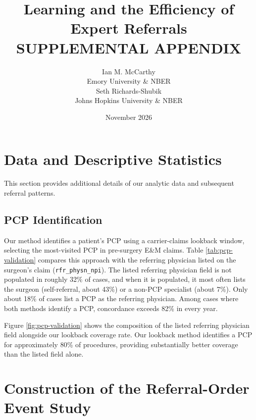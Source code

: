 \documentclass[12pt]{article}
\begin{document}
\title{Learning and the Efficiency of Expert Referrals \\
SUPPLEMENTAL APPENDIX}
\author{%
  Ian M. McCarthy \\[-1.5ex]
  Emory University \& NBER \\
  Seth Richards-Shubik \\[-1.5ex]
  Johns Hopkins University \& NBER
}
\date{November 2026}
\maketitle


\section{Data and Descriptive Statistics}
\label{app:desc}

This section provides additional details of our analytic data and subsequent referral patterns.

\subsection{PCP Identification}
\label{app:pcp-validation}

Our method identifies a patient's PCP using a carrier-claims lookback window, selecting the most-visited PCP in pre-surgery E\&M claims. Table \ref{tab:pcp-validation} compares this approach with the referring physician listed on the surgeon's claim (\texttt{rfr\_physn\_npi}). The listed referring physician field is not populated in roughly 32\% of cases, and when it is populated, it most often lists the surgeon (self-referral, about 43\%) or a non-PCP specialist (about 7\%). Only about 18\% of cases list a PCP as the referring physician. Among cases where both methods identify a PCP, concordance exceeds 82\% in every year.

Figure \ref{fig:pcp-validation} shows the composition of the listed referring physician field alongside our lookback coverage rate. Our lookback method identifies a PCP for approximately 80\% of procedures, providing substantially better coverage than the listed field alone.



\section{Construction of the Referral-Order Event Study}
\label{app:reduced-form}
\end{document}
